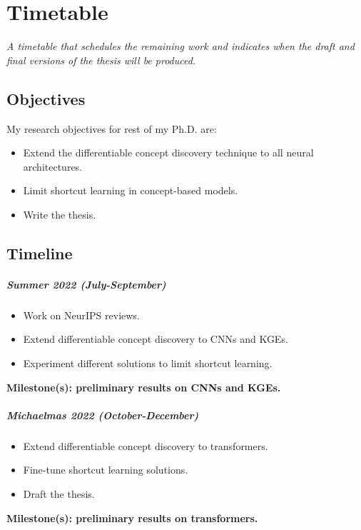 
\chapter*{Timetable}
\textit{A timetable that schedules the remaining work and indicates when the draft and final versions of the thesis will be produced.}


\section*{Objectives}
My research objectives for rest of my Ph.D. are:
\begin{itemize}
    \item Extend the differentiable concept discovery technique to all neural architectures.
    \item Limit shortcut learning in concept-based models.
    \item Write the thesis.
\end{itemize}


\section*{Timeline}

\paragraph{Summer 2022 (July-September)}
\begin{itemize}
    \item Work on NeurIPS reviews.
    \item Extend differentiable concept discovery to CNNs and KGEs.
	\item Experiment different solutions to limit shortcut learning.
\end{itemize}
\textbf{Milestone(s): preliminary results on CNNs and KGEs.}

\paragraph{Michaelmas 2022 (October-December)}
\begin{itemize}
	\item Extend differentiable concept discovery to transformers.
	\item Fine-tune shortcut learning solutions.
	\item Draft the thesis.
\end{itemize}
\textbf{Milestone(s): preliminary results on transformers.}

